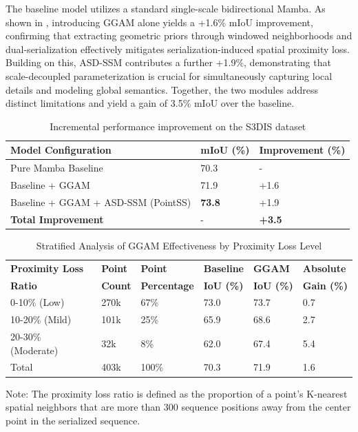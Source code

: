 \documentclass[a4paper,fleqn]{cas-sc}
\begin{document}
The baseline model utilizes a standard single-scale bidirectional Mamba. As shown in , introducing GGAM alone yields a +1.6\% mIoU improvement, confirming that extracting geometric priors through windowed neighborhoods and dual-serialization effectively mitigates serialization-induced spatial proximity loss. Building on this, ASD-SSM contributes a further +1.9\%, demonstrating that scale-decoupled parameterization is crucial for simultaneously capturing local details and modeling global semantics. Together, the two modules address distinct limitations and yield a gain of 3.5\% mIoU over the baseline.

\begin{table}[!t]
	\centering
	\caption{Incremental performance improvement on the S3DIS dataset}
	\label{tab:progressive_improvement}
	\begin{tabular}{lll}
		\toprule
		\textbf{Model Configuration} & \textbf{mIoU (\%)} & \textbf{Improvement (\%)} \\
		\midrule
		Pure Mamba Baseline & 70.3 & - \\
		Baseline + GGAM & 71.9 & +1.6 \\
		Baseline + GGAM + ASD-SSM (PointSS) & \textbf{73.8} & +1.9 \\
		\midrule
		\textbf{Total Improvement} & - & \textbf{+3.5} \\
		\bottomrule
	\end{tabular}
\end{table}

\begin{table}[!t]
	\centering
	\caption{Stratified Analysis of GGAM Effectiveness by Proximity Loss Level}
	\label{tab:ggam_fragmentation}
	\begin{tabular}{llllll}
		\toprule
		\textbf{Proximity Loss} & \textbf{Point} & \textbf{Point} & \textbf{Baseline} & \textbf{GGAM} & \textbf{Absolute} \\
		\textbf{Ratio} & \textbf{Count} & \textbf{Percentage} & \textbf{IoU (\%)} & \textbf{IoU (\%)} & \textbf{Gain (\%)} \\
		\midrule
		0-10\% (Low) & 270k & 67\% & 73.0 & 73.7 & 0.7 \\
		10-20\% (Mild) & 101k & 25\% & 65.9 & 68.6 & 2.7 \\
		20-30\% (Moderate) & 32k & 8\% & 62.0 & 67.4 & 5.4 \\
		\midrule
		Total & 403k & 100\% & 70.3 & 71.9 & 1.6 \\
		\bottomrule
	\end{tabular}
	\par\vspace{3pt}
	\footnotesize Note: The proximity loss ratio is defined as the proportion of a point's K-nearest spatial neighbors that are more than 300 sequence positions away from the center point in the serialized sequence.
\end{table}
\end{document}
